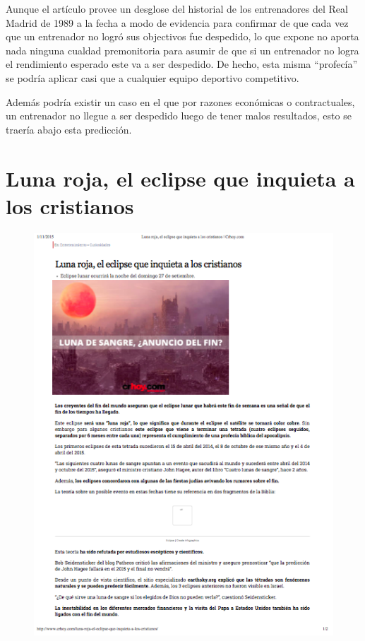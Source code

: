 \documentclass[times]{simauth}
\begin{document}
Aunque el artículo provee un desglose del historial de los entrenadores del Real Madrid de 1989 a la fecha a modo de evidencia para confirmar de que cada vez que un entrenador no logró sus objectivos fue despedido, lo que expone no aporta nada ninguna cualdad premonitoria para asumir de que si un entrenador no logra el rendimiento esperado este va a ser despedido. De hecho, esta misma ``profecía'' se podría aplicar casi que a cualquier equipo deportivo competitivo.

Además podría existir un caso en el que por razones económicas o contractuales, un entrenador no llegue a ser despedido luego de tener malos resultados, esto se traería abajo esta predicción.

\newpage
\section{Luna roja, el eclipse que inquieta a los cristianos}

\begin{figure}[h!]
    \centering
    \includegraphics[width=15cm]{lunaRoja}
    \label{fig:falacia4}
\end{figure}
\end{document}
